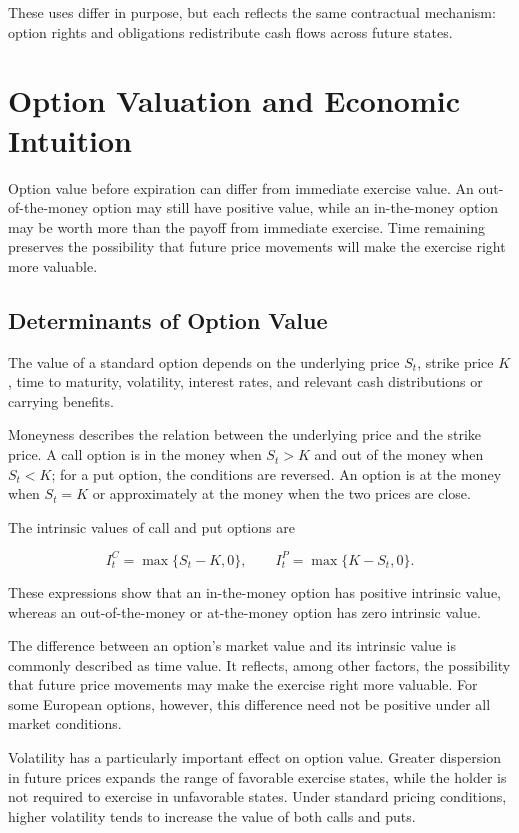 These uses differ in purpose, but each reflects the same contractual mechanism: option rights and obligations redistribute cash flows across future states.

\section{Option Valuation and Economic Intuition}

Option value before expiration can differ from immediate exercise value. An out-of-the-money option may still have positive value, while an in-the-money option may be worth more than the payoff from immediate exercise. Time remaining preserves the possibility that future price movements will make the exercise right more valuable.

\subsection{Determinants of Option Value}

The value of a standard option depends on the underlying price \(S_t\), strike price \(K\), time to maturity, volatility, interest rates, and relevant cash distributions or carrying benefits.

Moneyness describes the relation between the underlying
price and the strike price. A call option is in the money
when $S_t>K$ and out of the money when $S_t<K$; for a put
option, the conditions are reversed. An option is at the
money when $S_t=K$ or approximately at the money when
the two prices are close.

The intrinsic values of call and put options are

\begin{equation}
I_t^{C}=\max\{S_t-K,0\},
\qquad
I_t^{P}=\max\{K-S_t,0\}.
\label{eq:ch18-option-intrinsic}
\end{equation}

These expressions show that an in-the-money option has
positive intrinsic value, whereas an out-of-the-money or
at-the-money option has zero intrinsic value.

The difference between an option's market value and its
intrinsic value is commonly described as time value. It
reflects, among other factors, the possibility that future
price movements may make the exercise right more valuable.
For some European options, however, this difference need
not be positive under all market conditions.

Volatility has a particularly important effect on option value. Greater dispersion in future prices expands the range of favorable exercise states, while the holder is not required to exercise in unfavorable states. Under standard pricing conditions, higher volatility tends to increase the value of both calls and puts.

